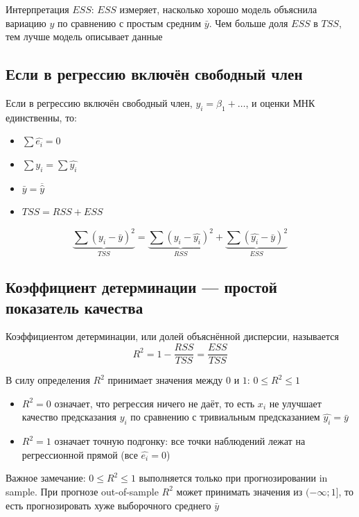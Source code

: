 \documentclass[12pt,a4paper]{article}
\numberwithin{equation}{section}
\theoremstyle{plain}
\theoremstyle{definition}
\theoremstyle{remark}
\begin{document}
Интерпретация $ESS$: $ESS$ измеряет, насколько хорошо модель объяснила вариацию $y$ по сравнению с простым средним $\bar{y}$. Чем больше доля $ESS$ в $TSS$, тем лучше модель описывает данные

\subsection{Если в регрессию включён свободный член}

Если в регрессию включён свободный член, $y_i = \beta_1 + \dots$, и оценки МНК единственны, то:

\begin{itemize}
    \item $\sum \hat{e_i} = 0$
    \item $\sum y_i = \sum \hat{y_i}$
    \item $\bar{y} = \overline{\hat{y}}$
    \item $TSS = RSS + ESS$
\end{itemize}

$$
    \underbrace{\sum \left(y_i - \bar{y}\right)^2}_{TSS} = \underbrace{\sum \left(y_i - \hat{y_i}\right)^2}_{RSS} + \underbrace{\sum \left(\hat{y_i} - \bar{y}\right)^2}_{ESS}
$$

\subsection{Коэффициент детерминации — простой показатель качества}

Коэффициентом детерминации, или долей объяснённой дисперсии, называется
$$
    R^2 = 1 - \frac{RSS}{TSS} = \frac{ESS}{TSS}
$$

В силу определения $R^2$ принимает значения между $0$ и $1$: $0 \leqslant R^2 \leqslant 1$

\begin{itemize}
    \item $R^2 = 0$ означает, что регрессия ничего не даёт, то есть $x_i$ не улучшает качество предсказания $y_i$ по сравнению с тривиальным предсказанием $\hat{y_i} = \bar{y}$
    \item $R^2 = 1$ означает точную подгонку: все точки наблюдений лежат на регрессионной прямой (все $\hat{e_i} = 0$)
\end{itemize}

Важное замечание: $0 \leqslant R^2 \leqslant 1$ выполняется только при прогнозировании in sample. При прогнозе out-of-sample $R^2$ может принимать значения из $(-\infty; 1]$, то есть прогнозировать хуже выборочного среднего $\bar{y}$
\end{document}
